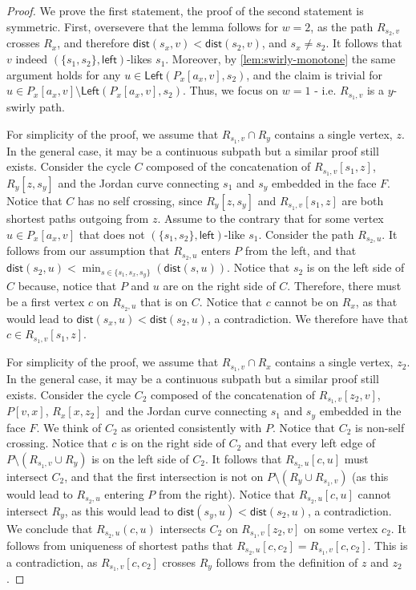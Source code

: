 \documentclass{article}
\newcommand{\Left}{\mathsf{Left}}
\newcommand{\leftside}{\mathsf{left}}
\newcommand{\dist}{\mathsf{dist}}
\begin{document}
\begin{proof}
    We prove the first statement, the proof of the second statement is symmetric.
    First, oversevere that the lemma follows for $w=2$, as the path $R_{s_2,v}$ crosses $R_x$, and therefore $\dist(s_x,v) < \dist(s_2,v)$, and $s_x \neq s_2$.
    It follows that $v$ indeed $(\{s_1,s_2\},\leftside)$-likes $s_1$.
    Moreover, by \cref{lem:swirly-monotone} the same argument holds for any $u\in\Left(P_x[a_x,v],s_2)$, and the claim is trivial for $u\in P_x[a_x,v]\setminus\Left(P_x[a_x,v],s_2)$.
    Thus, we focus on $w=1$ - i.e. $R_{s_1,v}$ is a $y$-swirly path.


For simplicity of the proof, we assume that $R_{s_1,v}\cap R_y$ contains a single vertex, $z$.
In the general case, it may be a continuous subpath but a similar proof still exists.
Consider the cycle $C$ composed of the concatenation of $R_{s_1,v}[s_1,z]$, $R_y[z,s_y]$  and the Jordan curve connecting $s_1$ and $s_y$ embedded in the face $F$.
Notice that $C$ has no self crossing, since $R_y[z,s_y]$ and $R_{s_1,v}[s_1,z]$ are both shortest paths outgoing from $z$.
Assume to the contrary that for some vertex $u\in P_x[a_x,v]$ that does not $(\{s_1,s_2\},\leftside)$-like $s_1$.
Consider the path $R_{s_2,u}$.
It follows from our assumption that $R_{s_2,u}$ enters $P$ from the left, and that $\dist(s_2,u) < \min_{s\in \{s_1,s_x,s_y\}}(\dist(s,u))$.
Notice that $s_2$ is on the left side of $C$ because, notice that $P$ and $u$ are on the right side of $C$.
Therefore, there must be a first vertex $c$ on $R_{s_2,u}$ that is on $C$.
Notice that $c$ cannot be on $R_x$, as that would lead to $\dist(s_x,u) < \dist(s_2,u)$, a contradiction.
We therefore have that $c\in R_{s_1,v}[s_1,z]$.

For simplicity of the proof, we assume that $R_{s_1,v}\cap R_x$ contains a single vertex, $z_2$.
In the general case, it may be a continuous subpath but a similar proof still exists.
Consider the cycle $C_2$ composed of the concatenation of $R_{s_1,v}[z_2,v]$, $P[v,x]$, $R_x[x,z_2]$ and the Jordan curve connecting $s_1$ and $s_y$ embedded in the face $F$.
We think of $C_2$ as oriented  consistently with $P$.
Notice that $C_2$ is non-self crossing.
Notice that $c$ is on the right side of $C_2$ and that every left edge of $P\setminus (R_{s_1,v} \cup R_y)$ is on the left side of $C_2$.
It follows that $R_{s_2,u}[c,u]$ must intersect $C_2$, and that the first intersection is not on $P \setminus (R_y \cup R_{s_1,v})$ (as this would lead to $R_{s_2,u}$ entering $P$ from the right).
Notice that $R_{s_2,u}[c,u]$ cannot intersect $R_y$, as this would lead to $\dist(s_y,u) < \dist(s_2,u)$, a contradiction.
We conclude that $R_{s_2,u}(c,u)$ intersects $C_2$ on $R_{s_1,v}[z_2,v]$ on some vertex $c_2$.
It follows from uniqueness of shortest paths that $R_{s_2,u}[c,c_2]= R_{s_1,v}[c,c_2]$.
This is a contradiction, as $R_{s_1,v}[c,c_2]$ crosses $R_y$ follows from the definition of $z$ and $z_2$.
\end{proof}
\end{document}
